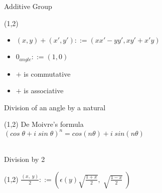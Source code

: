 \documentclass{beamer}
\begin{document}
\begin{frame}{Additive Group}
  \begin{textblock}{7}(1,2)
    \begin{itemize}
    \item $(x, y) + (x', y') ::= (x x' - y y', x y' + x' y)$
    \item $0_{angle} ::= (1, 0)$
    \item $+$ is commutative
    \item $+$ is associative
    \end{itemize}
  \end{textblock}
\end{frame}

\begin{frame}{Division of an angle by a natural}
  \begin{textblock}{7}(1,2)
    De Moivre's formula \\
    \hspace{5mm} $(cos \; \theta + i \; sin \; \theta)^n = cos (n
    \theta) + i \; sin (n \theta)$ \\
    \ \\
  \end{textblock}
\end{frame}

\begin{frame}{Division by 2}
  \begin{textblock}{8}(1,2)
    $\displaystyle \frac{(x, \; y)}{2} ::=
    \left( \epsilon (y) \sqrt{\frac{1 + x}{2}}, \; \sqrt{\frac{1 -
        x}{2}} \; \right)$
    \\
  \end{textblock}
\end{frame}
\end{document}
